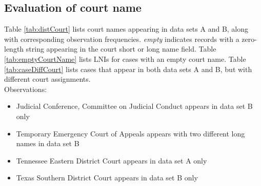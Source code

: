\documentclass[10pt, letterpaper]{article}
\begin{document}
\begin{spacing}{1.0}

\clearpage

\section{Evaluation of court name}

Table \ref{tab:distCourt} lists court names appearing in data sets A and B, along with corresponding observation frequencies.  \textit{empty} indicates records with a zero-length string appearing in the court short or long name field.  Table \ref{tab:emptyCourtName} lists LNIs for cases with an empty court name.  Table \ref{tab:caseDiffCourt} lists cases that appear in both data sets A and B, but with different court assignments.\\

Observations:

\begin{itemize}\setlength\itemsep{1pt}
    \item Judicial Conference, Committee on Judicial Conduct appears in data set B only
    \item Temporary Emergency Court of Appeals appears with two different long names in data set B
    \item Tennessee Eastern District Court appears in data set A only
    \item Texas Southern District Court appears in data set B only
\end{itemize}

\vspace{20pt}


\end{spacing}
\end{document}
